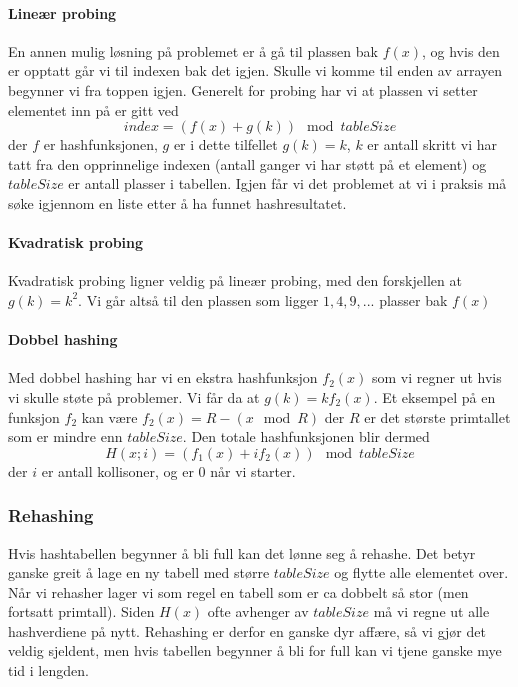 \paragraph{Lineær probing}
En annen mulig løsning på problemet er å gå til plassen bak $ f(x) $, og hvis den er opptatt går vi til indexen bak det igjen. Skulle vi komme til enden av arrayen begynner vi fra toppen igjen. Generelt for probing har vi at plassen vi setter elementet inn på er gitt ved
\[ index = (f(x) + g(k)) \mod{tableSize} \]
der $ f $ er hashfunksjonen, $ g $ er i dette tilfellet $ g(k) = k $, $ k $ er antall skritt vi har tatt fra den opprinnelige indexen (antall ganger vi har støtt på et element) og $ tableSize $ er antall plasser i tabellen. Igjen får vi det problemet at vi i praksis må søke igjennom en liste etter å ha funnet hashresultatet. 

\paragraph{Kvadratisk probing}
Kvadratisk probing ligner veldig på lineær probing, med den forskjellen at $ g(k) = k^2 $. Vi går altså til den plassen som ligger $ 1, 4, 9, ... $ plasser bak $ f(x) $

\paragraph{Dobbel hashing}
Med dobbel hashing har vi en ekstra hashfunksjon $ f_2(x) $ som vi regner ut hvis vi skulle støte på problemer. Vi får da at $ g(k) = k f_2(x) $. Et eksempel på en funksjon $ f_2 $ kan være $ f_2(x) = R-(x \mod R) $ der $ R $ er det største primtallet som er mindre enn $ tableSize $. Den totale hashfunksjonen blir dermed 
\[ H(x;i) = (f_1(x) + if_2(x)) \mod tableSize \]
der $ i $ er antall kollisoner, og er $ 0 $ når vi starter.



\subsubsection{Rehashing}
Hvis hashtabellen begynner å bli full kan det lønne seg å rehashe. Det betyr ganske greit å lage en ny tabell med større $ tableSize $ og flytte alle elementet over. Når vi rehasher lager vi som regel en tabell som er ca dobbelt så stor (men fortsatt primtall). Siden $ H(x) $ ofte avhenger av $ tableSize $ må vi regne ut alle hashverdiene på nytt. Rehashing er derfor en ganske dyr affære, så vi gjør det veldig sjeldent, men hvis tabellen begynner å bli for full kan vi tjene ganske mye tid i lengden. 


